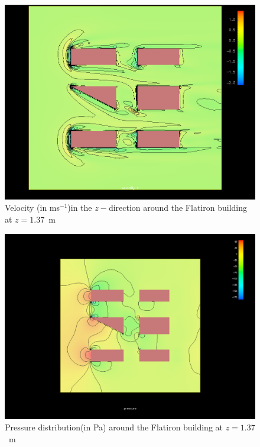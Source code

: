 \begin{figure}[hpb!]
\centering
\includegraphics[width = \textwidth]{zvelocity.png}
\caption{Velocity (in ms$^{-1}$)in the $z-$direction around the Flatiron building at $z=1.37$~m}
\label{fig:zvelocity}
\end{figure}
\begin{figure}[htp!]
\centering
\includegraphics[width =  \textwidth]{zpressure.png}
\caption{Pressure distribution(in Pa) around the Flatiron building at $z=1.37$~m}
\label{fig:zpressure}
\end{figure}
